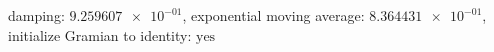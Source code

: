 damping: $\num[scientific-notation=true]{9.259607e-01}$, exponential moving average: $\num[scientific-notation=true]{8.364431e-01}$, initialize Gramian to identity: $\text{yes}$